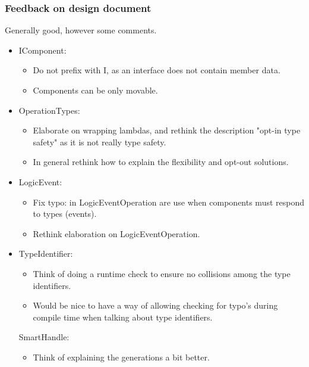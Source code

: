\documentclass{article}
\begin{document}
\subsubsection*{Feedback on design document}
Generally good, however some comments.
\begin{itemize}
    \item
    IComponent:
    \begin{itemize}
        \item
        Do not prefix with I, as an interface does not contain member data.

        \item
        Components can be only movable.
    \end{itemize}

    \item
    OperationTypes:
    \begin{itemize}
        \item
        Elaborate on wrapping lambdas, and rethink the description "opt-in type safety" as it is not really type safety.

        \item
        In general rethink how to explain the flexibility and opt-out solutions.
    \end{itemize}

    \item
    LogicEvent:
    \begin{itemize}
        \item
        Fix typo: in LogicEventOperation are use when components must respond to types (events).

        \item
        Rethink elaboration on LogicEventOperation.
    \end{itemize}

    \item
    TypeIdentifier:
    \begin{itemize}
        \item
        Think of doing a runtime check to ensure no collisions among the type identifiers.

        \item
        Would be nice to have a way of allowing checking for typo's during compile time when talking about type identifiers.
    \end{itemize}

    SmartHandle:
    \begin{itemize}
        \item
        Think of explaining the generations a bit better.
    \end{itemize}


\end{itemize}
\end{document}
